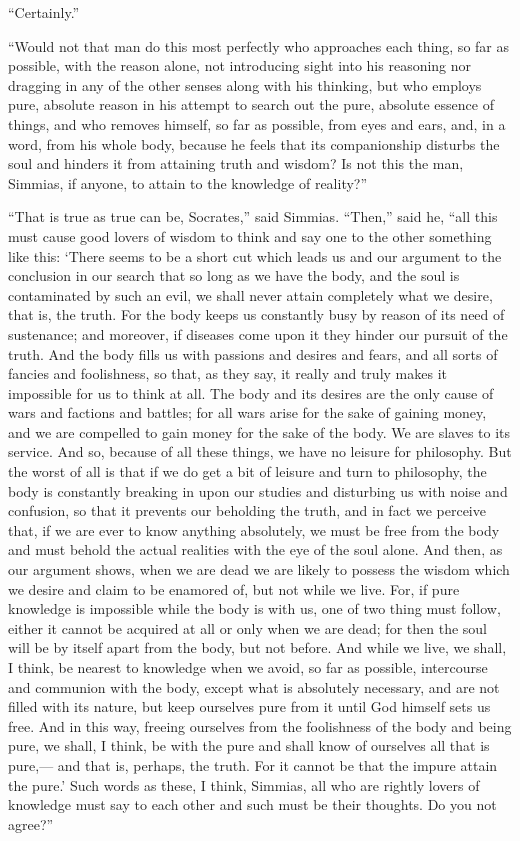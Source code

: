 \documentclass[letterpaper,12pt]{article}
\newcommand{\stephpag}[1]{\marginnote{\small\itshape\fontfamily{ppl}\selectfont #1}}
\begin{document}
\begin{drama}
``Certainly.''
 
``Would not that man do this most perfectly who approaches each thing, so far as possible, with the reason alone, not introducing sight into his reasoning nor dragging in \stephpag{66 a} any of the other senses along with his thinking, but who employs pure, absolute reason in his attempt to search out the pure, absolute essence of things, and who removes himself, so far as possible, from eyes and ears, and, in a word, from his whole body, because he feels that its companionship disturbs the soul and hinders it from attaining truth and wisdom? Is not this the man, Simmias, if anyone, to attain to the knowledge of reality?''
 
``That is true as true can be, Socrates,'' said Simmias. \stephpag{b} ``Then,'' said he, ``all this must cause good lovers of wisdom to think and say one to the other something like this: `There seems to be a short cut which leads us and our argument to the conclusion in our search that so long as we have the body, and the soul is contaminated by such an evil, we shall never attain completely what we desire, that is, the truth. For the body keeps us constantly busy by reason of its need of sustenance; \stephpag{c} and moreover, if diseases come upon it they hinder our pursuit of the truth. And the body fills us with passions and desires and fears, and all sorts of fancies and foolishness, so that, as they say, it really and truly makes it impossible for us to think at all. The body and its desires are the only cause of wars and factions and battles; for all wars arise for the sake of gaining money, and we are compelled to gain money \stephpag{d} for the sake of the body. We are slaves to its service. And so, because of all these things, we have no leisure for philosophy. But the worst of all is that if we do get a bit of leisure and turn to philosophy, the body is constantly breaking in upon our studies and disturbing us with noise and confusion, so that it prevents our beholding the truth, and in fact we perceive that, if we are ever to know anything absolutely, we must be free from the body and must behold \stephpag{e} the actual realities with the eye of the soul alone. And then, as our argument shows, when we are dead we are likely to possess the wisdom which we desire and claim to be enamored of, but not while we live. For, if pure knowledge is impossible while the body is with us, one of two thing must follow, either it cannot be acquired at all or only when we are dead; for then the soul \stephpag{67 a} will be by itself apart from the body, but not before. And while we live, we shall, I think, be nearest to knowledge when we avoid, so far as possible, intercourse and communion with the body, except what is absolutely necessary, and are not filled with its nature, but keep ourselves pure from it until God himself sets us free. And in this way, freeing ourselves from the foolishness of the body and being pure, we shall, I think, be with the pure and shall know of ourselves all that is pure,--- \stephpag{b} and that is, perhaps, the truth. For it cannot be that the impure attain the pure.' Such words as these, I think, Simmias, all who are rightly lovers of knowledge must say to each other and such must be their thoughts. Do you not agree?''
 

\end{drama}
\end{document}
